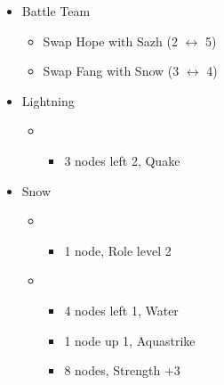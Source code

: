 	\renewcommand{\first}{[1] Strike Team (\com/\syn/\com)}
	\renewcommand{\second}{[2] Tri-Disaster (\rav/\rav/\rav)}
	\renewcommand{\third}{[3] Tri-Disaster (\rav/\rav/\rav)}
	\renewcommand{\fourth}{[4] Cerberus (\com/\com/\com)}
	\renewcommand{\fifth}{[5] Cerberus (\com/\com/\com)}
	\begin{menu}
		\begin{itemize}
			\paradigm
			\begin{itemize}
				\item Battle Team
				      \begin{itemize}
					      \item Swap Hope with Sazh (2 $\leftrightarrow$ 5)
					      \item Swap Fang with Snow (3 $\leftrightarrow$ 4)
				      \end{itemize}
				      {\paradigmline[1]{\textit{\com}}{\textit{\syn}}{\textit{(\com)}}}%
				      {\paradigmline{(\rav)}{\rav}{\rav}}%
				      {\paradigmline{[\rav]}{(\rav)}{(\rav)}}%
				      {\paradigmline{\com}{[\com]}{\com}}%
				      {\paradigmline{\com}{[\com]}{\com}}
			\end{itemize}
			\crystarium
			\begin{itemize}
				\item Lightning
				      \begin{itemize}
					      \item \com
					            \begin{itemize}
						            \item 3 nodes left 2, Quake
					            \end{itemize}
				      \end{itemize}
				\item Snow
				      \begin{itemize}
					      \item \com
					            \begin{itemize}
						            \item 1 node, Role level 2
					            \end{itemize}
					      \item \rav
					            \begin{itemize}
						            \item 4 nodes left 1, Water
						            \item 1 node up 1, Aquastrike
						            \item 8 nodes, Strength +3

\end{itemize}
\end{itemize}
\end{itemize}
\end{itemize}
\end{menu}
